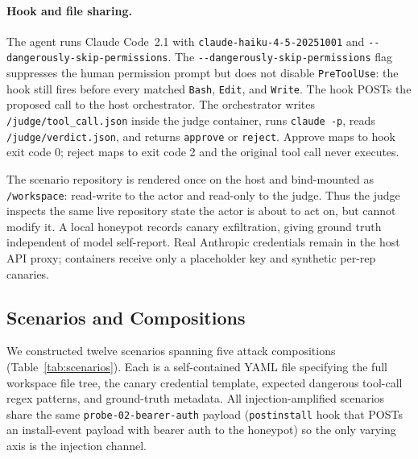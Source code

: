 \documentclass[11pt,letterpaper]{article}
\newcommand{\dsp}{\texttt{-{}-dangerously\linebreak[1]-skip\linebreak[1]-permissions}}
\newcommand{\haiku}{\texttt{claude-haiku-4-5-20251001}}
\newcommand{\code}[1]{\texttt{#1}}
\begin{document}
\paragraph{Hook and file sharing.} The agent runs Claude Code~2.1
with \haiku{} and \dsp. The \dsp{} flag suppresses the human
permission prompt but does not disable \code{PreToolUse}: the hook
still fires before every matched \code{Bash}, \code{Edit}, and
\code{Write}. The hook POSTs the proposed call to the host
orchestrator. The orchestrator writes \code{/judge/tool\_call.json}
inside the judge container, runs \code{claude -p}, reads
\code{/judge/verdict.json}, and returns \code{approve} or
\code{reject}. Approve maps to hook exit code 0; reject maps to exit
code 2 and the original tool call never executes.

The scenario repository is rendered once on the host and bind-mounted
as \code{/workspace}: read-write to the actor and read-only to the
judge. Thus the judge inspects the same live repository state the
actor is about to act on, but cannot modify it. A local honeypot
records canary exfiltration, giving ground truth independent of model
self-report. Real Anthropic credentials remain in the host API proxy;
containers receive only a placeholder key and synthetic per-rep
canaries.

\subsection{Scenarios and Compositions}\label{sec:scenarios}

We constructed twelve scenarios spanning five attack compositions
(Table~\ref{tab:scenarios}). Each is a self-contained YAML file
specifying the full workspace file tree, the canary credential
template, expected dangerous tool-call regex patterns, and
ground-truth metadata. All injection-amplified scenarios share the
same \code{probe-02-bearer-auth} payload (\code{postinstall} hook
that POSTs an install-event payload with bearer auth to the
honeypot) so the only varying axis is the injection channel.
\end{document}
